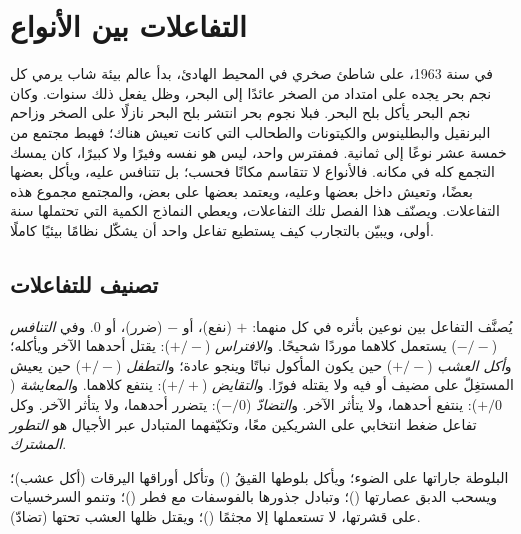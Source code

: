 \chapter{التفاعلات بين الأنواع}\label{ch:b1:species-interactions}

في سنة 1963، على شاطئ صخري في المحيط الهادئ، بدأ عالم بيئة شاب
يرمي كل نجم بحر يجده على امتداد من الصخر عائدًا إلى
البحر، وظل يفعل ذلك سنوات. وكان نجم البحر يأكل بلح البحر. فبلا
نجوم بحر انتشر بلح البحر نازلًا على الصخر وزاحم البرنقيل
والبطلينوس والكيتونات والطحالب التي كانت تعيش هناك؛ فهبط مجتمع من
خمسة عشر نوعًا إلى ثمانية. فمفترس واحد، ليس هو نفسه وفيرًا ولا
كبيرًا، كان يمسك التجمع كله في مكانه. فالأنواع لا تتقاسم مكانًا
فحسب؛ بل تتنافس عليه، ويأكل بعضها بعضًا، وتعيش داخل بعضها وعليه،
ويعتمد بعضها على بعض، والمجتمع مجموع هذه التفاعلات. ويصنّف هذا
الفصل تلك التفاعلات، ويعطي النماذج الكمية   التي
تحتملها سنة أولى، ويبيّن بالتجارب كيف يستطيع تفاعل واحد أن يشكّل
نظامًا بيئيًا كاملًا.

\section{تصنيف للتفاعلات}

\begin{definition}\label{def:b1:species-interactions:types}
يُصنَّف التفاعل بين نوعين بأثره في
كل منهما: $+$ (نفع)، أو $-$ (ضرر)، أو $0$. وفي \emph{التنافس} ($-/-$) يستعمل
كلاهما موردًا شحيحًا. و\emph{الافتراس} ($+/-$): يقتل أحدهما
الآخر ويأكله؛ و\emph{أكل العشب} ($+/-$) حين يكون المأكول نباتًا
وينجو عادة؛ و\emph{التطفل} ($+/-$) حين يعيش المستغِلّ
على مضيف أو فيه ولا يقتله فورًا. و\emph{التقايض}
($+/+$): ينتفع كلاهما. و\emph{المعايشة} ($+/0$): ينتفع أحدهما،
ولا يتأثر الآخر. و\emph{التضادّ} ($-/0$): يتضرر أحدهما،
ولا يتأثر الآخر. وكل تفاعل ضغط انتخابي على الشريكين
معًا، وتكيّفهما المتبادل عبر الأجيال هو
\emph{التطور المشترك}.
\end{definition}

\begin{example}\label{ex:b1:species-interactions:oak}
البلوطة  جاراتها على الضوء؛ ويأكل بلوطها
القيقُ () وتأكل أوراقها اليرقات (أكل عشب)؛ ويسحب الدبق
عصارتها ()؛ وتبادل جذورها  بالفوسفات
مع فطر ()؛ وتنمو السرخسيات على قشرتها، لا تستعملها إلا
مجثمًا ()؛ ويقتل ظلها العشب تحتها
(تضادّ).
\end{example}

